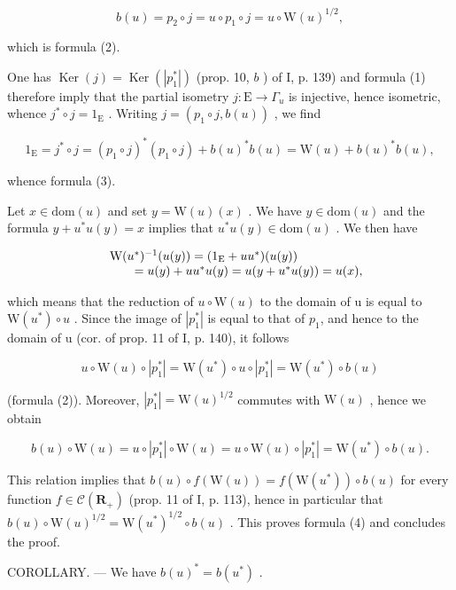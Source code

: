 \[
b (u) = p _ {2} \circ j = u \circ p _ {1} \circ j = u \circ \mathrm{W} (u) ^ {1 / 2},
\]

which is formula (2).

One has \(\operatorname{Ker}(j) = \operatorname{Ker}(|p_1^*|)\) (prop. 10, \(b\) ) of I, p. 139) and formula (1) therefore imply that the partial isometry \(j: \mathrm{E} \to \Gamma_u\) is injective, hence isometric, whence \(j^* \circ j = 1_{\mathrm{E}}\) . Writing \(j = (p_1 \circ j, b(u))\) , we find

\[
1 _ {\mathrm{E}} = j ^ {*} \circ j = (p _ {1} \circ j) ^ {*} (p _ {1} \circ j) + b (u) ^ {*} b (u) = \mathrm{W} (u) + b (u) ^ {*} b (u),
\]

whence formula (3).

Let \(x \in \mathrm{dom}(u)\) and set \(y = \mathrm{W}(u)(x)\) . We have \(y \in \mathrm{dom}(u)\) and the formula \(y + u^{*}u(y) = x\) implies that \(u^{*}u(y) \in \mathrm{dom}(u)\) . We then have

\[
\begin{array}{r l} & {\mathrm{W} (u ^ {*}) ^ {- 1} (u (y)) = (1 _ {\mathrm{E}} + u u ^ {*}) (u (y))} \\ & {\qquad = u (y) + u u ^ {*} u (y) = u (y + u ^ {*} u (y)) = u (x),} \end{array}
\]

which means that the reduction of \(u \circ \mathrm{W}(u)\) to the domain of u is equal to \(\mathrm{W}(u^{*}) \circ u\) . Since the image of \(|p_{1}^{*}|\) is equal to that of \(p_{1}\), and hence to the domain of u (cor. of prop. 11 of I, p. 140), it follows

\[
u \circ \mathrm{W} (u) \circ | p _ {1} ^ {*} | = \mathrm{W} (u ^ {*}) \circ u \circ | p _ {1} ^ {*} | = \mathrm{W} (u ^ {*}) \circ b (u)
\]

(formula (2)). Moreover, \(|p_{1}^{*}| = \mathrm{W}(u)^{1/2}\) commutes with \(\mathrm{W}(u)\) , hence we obtain

\[
b (u) \circ \mathrm{W} (u) = u \circ | p _ {1} ^ {*} | \circ \mathrm{W} (u) = u \circ \mathrm{W} (u) \circ | p _ {1} ^ {*} | = \mathrm{W} (u ^ {*}) \circ b (u).
\]

This relation implies that \(b(u) \circ f(\mathrm{W}(u)) = f(\mathrm{W}(u^{*})) \circ b(u)\) for every function \(f \in \mathcal{C}(\mathbf{R}_{+})\) (prop. 11 of I, p. 113), hence in particular that \(b(u) \circ \mathrm{W}(u)^{1/2} = \mathrm{W}(u^{*})^{1/2} \circ b(u)\) . This proves formula (4) and concludes the proof.

COROLLARY. --- We have \(b(u)^{*} = b(u^{*})\) .


